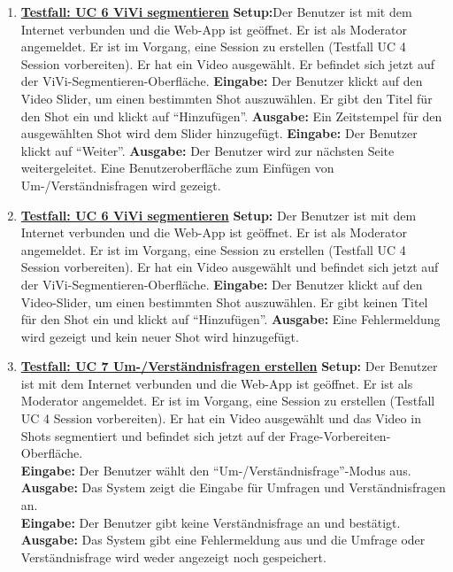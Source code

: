 \begin{enumerate}
	\item \underline{\textbf{Testfall: UC 6 ViVi segmentieren}} \linebreak
	\textbf{Setup:}Der Benutzer ist mit dem Internet verbunden und die Web-App ist geöffnet. Er ist als Moderator angemeldet. Er ist im Vorgang, eine Session zu erstellen (Testfall UC 4 Session vorbereiten). Er hat ein Video ausgewählt. Er befindet sich jetzt auf der ViVi-Segmentieren-Oberfläche.\linebreak
	\textbf{Eingabe:} Der Benutzer klickt auf den Video Slider, um einen bestimmten Shot auszuwählen. Er gibt den Titel für den Shot ein und klickt auf ``Hinzufügen''. \linebreak
	\textbf{Ausgabe:} Ein Zeitstempel für den ausgewählten Shot wird dem Slider hinzugefügt.\linebreak
	\textbf{Eingabe:} Der Benutzer klickt auf ``Weiter''. \linebreak
	\textbf{Ausgabe:} Der Benutzer wird zur nächsten Seite weitergeleitet. Eine Benutzeroberfläche zum Einfügen von Um-/Verständnisfragen wird gezeigt.
	
	\item \underline{\textbf{Testfall: UC 6 ViVi segmentieren}} \linebreak
	\textbf{Setup:} Der Benutzer ist mit dem Internet verbunden und die Web-App ist geöffnet. Er ist als Moderator angemeldet. Er ist im Vorgang, eine Session zu erstellen (Testfall UC 4 Session vorbereiten). Er hat ein Video ausgewählt und befindet sich jetzt auf der ViVi-Segmentieren-Oberfläche.\linebreak
	\textbf{Eingabe:} Der Benutzer klickt auf den Video-Slider, um einen bestimmten Shot auszuwählen. Er gibt keinen Titel für den Shot ein und klickt auf ``Hinzufügen''. \linebreak
	\textbf{Ausgabe:} Eine Fehlermeldung wird gezeigt und kein neuer Shot wird hinzugefügt. \linebreak \linebreak
	
	\item \underline{\textbf{Testfall: UC 7 Um-/Verständnisfragen erstellen}} \linebreak
	\textbf{Setup:} Der Benutzer ist mit dem Internet verbunden und die Web-App ist geöffnet. Er ist als Moderator angemeldet. Er ist im Vorgang, eine Session zu erstellen (Testfall UC 4 Session vorbereiten). Er hat ein Video ausgewählt und das Video in Shots segmentiert und befindet sich jetzt auf der Frage-Vorbereiten-Oberfläche.\\
	\textbf{Eingabe:} Der Benutzer wählt den ``Um-/Verständnisfrage''-Modus aus. \\
	\textbf{Ausgabe:} Das System zeigt die Eingabe für Umfragen und Verständnisfragen an.\\ 
	\textbf{Eingabe:} Der Benutzer gibt keine Verständnisfrage an und bestätigt.\\
	\textbf{Ausgabe:} Das System gibt eine Fehlermeldung aus und die Umfrage oder Verständnisfrage wird weder angezeigt noch gespeichert.


\end{enumerate}
